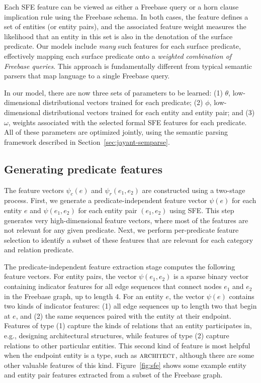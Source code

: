 \documentclass[11pt]{article}
\newcommand{\secref}[1]{Section~\ref{sec:#1}}
\newcommand{\figref}[1]{Figure~\ref{fig:#1}}
\newcommand{\entity}[1]{\ensuremath{\textsc{#1}}}
\begin{document}
Each SFE feature can be viewed as either a Freebase query or a horn clause
implication rule using the Freebase schema. In both cases, the feature defines
a set of entities (or entity pairs), and the associated feature weight measures
the likelihood that an entity in this set is also in the denotation of the
surface predicate. Our models include \emph{many} such features for each
surface predicate, effectively mapping each surface predicate onto a
\emph{weighted combination of Freebase queries}. This approach is fundamentally
different from typical semantic parsers that map language to a single Freebase
query.

In our model, there are now three sets of parameters to be learned: (1)
$\theta$, low-dimensional distributional vectors trained for each predicate;
(2) $\phi$, low-dimensional distributional vectors trained for each entity and
entity pair; and (3) $\omega$, weights associated with the selected formal SFE
features for each predicate.  All of these parameters are optimized jointly,
using the semantic parsing framework described in \secref{jayant-semparse}.

\subsection{Generating predicate features}
\label{sec:feature-generation}

The feature vectors $\psi_c(e)$ and $\psi_r(e_1, e_2)$ are constructed using a
two-stage process. First, we generate a predicate-independent feature vector
$\psi(e)$ for each entity $e$ and $\psi(e_1, e_2)$ for each entity pair $(e_1,
e_2)$ using SFE. This step generates very high-dimensional feature vectors,
where most of the features are not relevant for any given predicate. Next, we
perform per-predicate feature selection to identify a subset of these features
that are relevant for each category and relation predicate.

The predicate-independent feature extraction stage computes the following
feature vectors. For entity pairs, the vector $\psi(e_1, e_2)$ is a sparse
binary vector containing indicator features for all edge sequences that connect
nodes $e_1$ and $e_2$ in the Freebase graph, up to length 4.  For an entity
$e$, the vector $\psi(e)$ contains two kinds of indicator features: (1) all
edge sequences up to length two that begin at $e$, and (2) the same sequences
paired with the entity at their endpoint. Features of type (1) capture the
kinds of relations that an entity participates in, e.g., designing
architectural structures, while features of type (2) capture relations to other
particular entities. This second kind of feature is most helpful when the
endpoint entity is a type, such as \entity{architect}, although there are some
other valuable features of this kind. \figref{sfe} shows some example entity
and entity pair features extracted from a subset of the Freebase graph.
\end{document}
